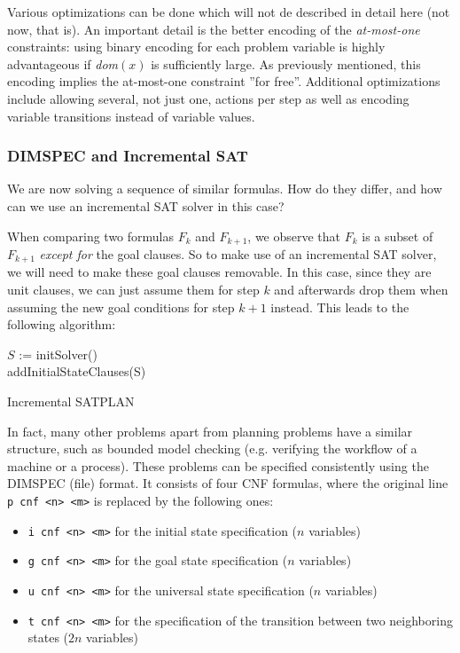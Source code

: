 \documentclass{article}
\theoremstyle{definition}
\begin{document}
Various optimizations can be done which will not de described in detail here (not now, that is). An important detail is the better encoding of the \emph{at-most-one} constraints: using binary encoding for each problem variable is highly advantageous if \textit{dom}$(x)$ is sufficiently large. As previously mentioned, this encoding implies the at-most-one constraint ''for free''. Additional optimizations include allowing several, not just one, actions per step as well as encoding variable transitions instead of variable values.

\subsubsection{DIMSPEC and Incremental SAT}

We are now solving a sequence of similar formulas. How do they differ, and how can we use an incremental SAT solver in this case?

When comparing two formulas $F_k$ and $F_{k+1}$, we observe that $F_k$ is a subset of $F_{k+1}$ \emph{except for} the goal clauses. So to make use of an incremental SAT solver, we will need to make these goal clauses removable. In this case, since they are unit clauses, we can just assume them for step $k$ and afterwards drop them when assuming the new goal conditions for step $k+1$ instead. This leads to the following algorithm:

\begin{algorithm}
$S$ := initSolver()\\
addInitialStateClauses(S)\\
\caption{Incremental SATPLAN}
\label{alg:incremental_satplan}
\end{algorithm}

In fact, many other problems apart from planning problems have a similar structure, such as bounded model checking (e.g. verifying the workflow of a machine or a process). These problems can be specified consistently using the DIMSPEC (file) format. It consists of four CNF formulas, where the original line \texttt{p cnf <n> <m>} is replaced by the following ones:
\begin{itemize}
\item \texttt{i cnf <n> <m>} for the initial state specification ($n$ variables)
\item \texttt{g cnf <n> <m>} for the goal state specification ($n$ variables)
\item \texttt{u cnf <n> <m>} for the universal state specification ($n$ variables)
\item \texttt{t cnf <n> <m>} for the specification of the transition between two neighboring states ($2n$ variables)
\end{itemize}
\end{document}
